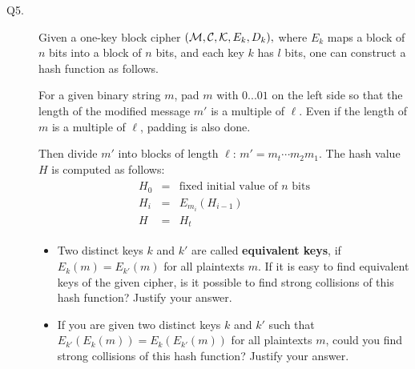 \documentclass[11pt,epsfig]{article}
\newcommand{\cM}{{\cal M}}
\newcommand{\cC}{{\cal C}}
\newcommand{\cK}{{\cal K}}
\begin{document}
\begin{description}
\item[Q5.] 
Given a one-key block cipher
$(\cM, \cC, \cK, E_k, D_k),$ 
where $E_k$ maps a block of $n$ bits into a block of $n$ bits, and each
key $k$ has $l$ bits, one can construct a hash function as follows. 

For a given binary string $m$,   
pad $m$ with $0...01$ on the left side so that the length of the modified message $m'$ is 
a multiple of $\ell$.  Even if the length of $m$ is a multiple of $\ell$, padding is also done. 

Then divide $m'$ into blocks of length $\ell$: 
$ 
m'= m_{t} \cdots m_2m_1.
$ 
The hash value $H$ is computed as follows:
\begin{eqnarray*}
\begin{array}{lll}
H_0 &=& \mbox{fixed initial value of $n$ bits} \\
H_i &=& E_{m_{i}}(H_{i-1}) \\
H   &=& H_t
\end{array}
\end{eqnarray*}

\begin{itemize}
\item Two distinct keys $k$ and $k'$ are called {\bf equivalent keys}, if $E_k(m)=E_{k'}(m)$ for all plaintexts $m$. 
If it is easy to find equivalent keys of the given cipher,  is it possible to find strong collisions of this hash function? Justify your answer.     \hfill {}


\item If you are given two distinct keys $k$ and $k'$ such that $E_{k'}(E_k(m))=E_k(E_{k'}(m))$ for all plaintexts $m$,  
could you find strong collisions of this hash function? Justify your answer.    \hfill {}
\end{itemize}


\end{description}
\end{document}

